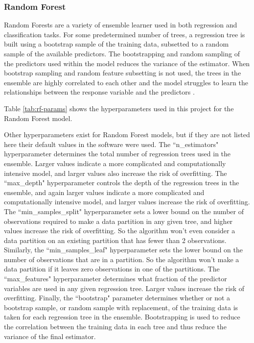 \subsubsection{Random Forest}
\hfill

Random Forests are a variety of ensemble learner used in both regression and classification tasks. For some predetermined number of trees, a regression tree is built using a bootstrap sample of the training data, subsetted to a random sample of the available predictors. The bootstrapping and random sampling of the predictors used within the model reduces the variance of the estimator. When bootstrap sampling and random feature subsetting is not used, the trees in the ensemble are highly correlated to each other and the model struggles to learn the relationships between the response variable and the predictors \citep[p.\ 587]{Hastie-2010-ESL}. 

Table \ref{tab:rf-params} shows the hyperparameters used in this project for the Random Forest model.

Other hyperparameters exist for Random Forest models, but if they are not listed here their default values in the software were used. The ``n\_estimators" hyperparameter determines the total number of regression trees used in the ensemble. Larger values indicate a more complicated and computationally intensive model, and larger values also increase the risk of overfitting. The ``max\_depth" hyperparameter controls the depth of the regression trees in the ensemble, and again larger values indicate a more complicated and computationally intensive model, and larger values increase the risk of overfitting. The ``min\_samples\_split" hyperparameter sets a lower bound on the number of observations required to make a data partition in any given tree, and higher values increase the risk of overfitting. So the algorithm won't even consider a data partition on an existing partition that has fewer than 2 observations. Similarly, the ``min\_samples\_leaf" hyperparameter sets the lower bound on the number of observations that are in a partition. So the algorithm won't make a data partition if it leaves zero observations in one of the partitions. The ``max\_features" hyperparameter determines what fraction of the predictor variables are used in any given regression tree. Larger values increase the risk of overfitting. Finally, the ``bootstrap" parameter determines whether or not a bootstrap sample, or random sample with replacement, of the training data is taken for each regression tree in the ensemble. Bootstrapping is used to reduce the correlation between the training data in each tree and thus reduce the variance of the final estimator. 

